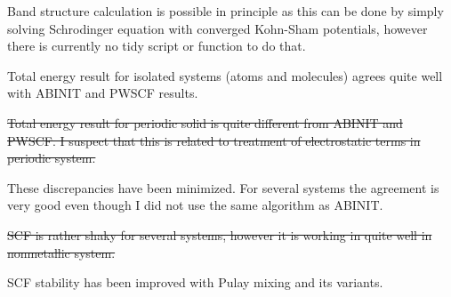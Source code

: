 \documentclass[a4paper,10pt]{article}
\begin{document}
Band structure calculation is possible in principle as this can be
done by simply solving
Schrodinger equation with converged Kohn-Sham potentials, however there
is currently no tidy script or function to do that.

Total energy result for isolated systems (atoms and molecules) agrees quite
well with ABINIT and PWSCF results.

\sout{Total energy result for periodic solid is quite different from ABINIT and PWSCF.
I suspect that this is related to treatment of electrostatic terms in periodic system.}

These discrepancies have been minimized. For several systems the agreement is very good
even though I did not use the same algorithm as ABINIT.

\sout{SCF is rather shaky for several systems, however it is working in quite well in nonmetallic
system.}

SCF stability has been improved with Pulay mixing and its variants.





\end{document}

